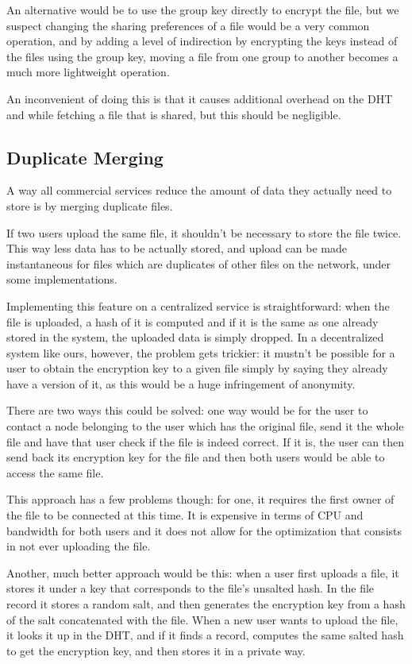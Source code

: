 \documentclass[11pt]{IEEEtran}
\begin{document}
An alternative would be to use the group key directly to encrypt the file, but we suspect changing the sharing preferences of a file would be a very common operation, and by adding a level of indirection by encrypting the keys instead of the files using the group key, moving a file from one group to another becomes a much more lightweight operation.

An inconvenient of doing this is that it causes additional overhead on the DHT and while fetching a file that is shared, but this should be negligible.

\subsection{Duplicate Merging}

A way all commercial services reduce the amount of data they actually need to store is by merging duplicate files.

If two users upload the same file, it shouldn't be necessary to store the file twice. This way less data has to be actually stored, and upload can be made instantaneous for files which are duplicates of other files on the network, under some implementations.

Implementing this feature on a centralized service is straightforward: when the file is uploaded, a hash of it is computed and if it is the same as one already stored in the system, the uploaded data is simply dropped. In a decentralized system like ours, however, the problem gets trickier: it mustn't be possible for a user to obtain the encryption key to a given file simply by saying they already have a version of it, as this would be a huge infringement of anonymity.

There are two ways this could be solved: one way would be for the user to contact a node belonging to the user which has the original file, send it the whole file and have that user check if the file is indeed correct. If it is, the user can then send back its encryption key for the file and then both users would be able to access the same file.

This approach has a few problems though: for one, it requires the first owner of the file to be connected at this time. It is expensive in terms of CPU and bandwidth for both users and it does not allow for the optimization that consists in not ever uploading the file.

Another, much better approach would be this: when a user first uploads a file, it stores it under a key that corresponds to the file's unsalted hash. In the file record it stores a random salt, and then generates the encryption key from a hash of the salt concatenated with the file. When a new user wants to upload the file, it looks it up in the DHT, and if it finds a record, computes the same salted hash to get the encryption key, and then stores it in a private way.
\end{document}
